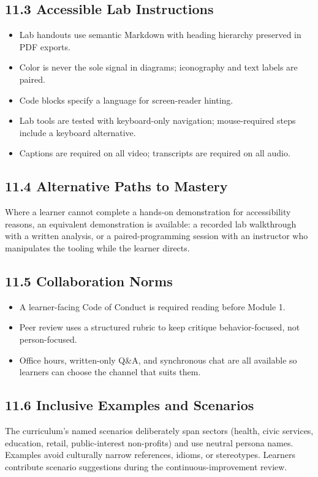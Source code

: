 \documentclass[11pt,letterpaper,oneside]{report}
\begin{document}
\subsection*{11.3 Accessible Lab Instructions}
\begin{itemize}
  \item Lab handouts use semantic Markdown with heading hierarchy preserved in PDF exports.
  \item Color is never the sole signal in diagrams; iconography and text labels are paired.
  \item Code blocks specify a language for screen-reader hinting.
  \item Lab tools are tested with keyboard-only navigation; mouse-required steps include a keyboard alternative.
  \item Captions are required on all video; transcripts are required on all audio.
\end{itemize}

\subsection*{11.4 Alternative Paths to Mastery}
Where a learner cannot complete a hands-on demonstration for accessibility reasons, an equivalent demonstration is available: a recorded lab walkthrough with a written analysis, or a paired-programming session with an instructor who manipulates the tooling while the learner directs.

\subsection*{11.5 Collaboration Norms}
\begin{itemize}
  \item A learner-facing Code of Conduct is required reading before Module 1.
  \item Peer review uses a structured rubric to keep critique behavior-focused, not person-focused.
  \item Office hours, written-only Q\&A, and synchronous chat are all available so learners can choose the channel that suits them.
\end{itemize}

\subsection*{11.6 Inclusive Examples and Scenarios}
The curriculum's named scenarios deliberately span sectors (health, civic services, education, retail, public-interest non-profits) and use neutral persona names. Examples avoid culturally narrow references, idioms, or stereotypes. Learners contribute scenario suggestions during the continuous-improvement review.
\end{document}
